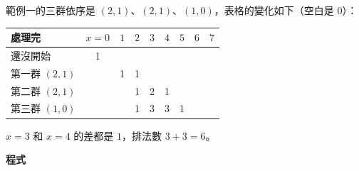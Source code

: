 範例一的三群依序是 $(2, 1)$、$(2, 1)$、$(1, 0)$，表格的變化如下（空白是
$0$）：

\begin{center}
\begin{tabular}{lcccccccc}
\toprule
處理完 & $x = 0$ & $1$ & $2$ & $3$ & $4$ & $5$ & $6$ & $7$ \\
\midrule
還沒開始 & 1 & & & & & & & \\
第一群 $(2, 1)$ & & 1 & 1 & & & & & \\
第二群 $(2, 1)$ & & & 1 & 2 & 1 & & & \\
第三群 $(1, 0)$ & & & 1 & 3 & 3 & 1 & & \\
\bottomrule
\end{tabular}
\end{center}

$x = 3$ 和 $x = 4$ 的差都是 $1$，排法數 $3 + 3 = 6$。

\textbf{程式}

